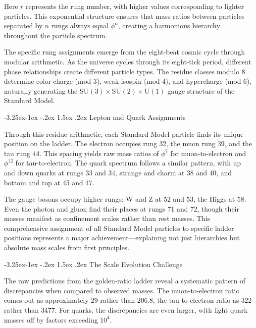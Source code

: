 \documentclass[11pt,a4paper]{article}
\makeatletter
\renewcommand\subsection{\@startsection{subsection}{2}{\z@}%
  {-3.25ex\@plus -1ex \@minus -.2ex}%
  {1.5ex \@plus .2ex}%
  {\normalfont\large\bfseries\color{darkblue}}}
\theoremstyle{definition}
\makeatother
\begin{document}
Here $r$ represents the rung number, with higher values corresponding to lighter particles. This exponential structure ensures that mass ratios between particles separated by $n$ rungs always equal $\phi^n$, creating a harmonious hierarchy throughout the particle spectrum.

The specific rung assignments emerge from the eight-beat cosmic cycle through modular arithmetic. As the universe cycles through its eight-tick period, different phase relationships create different particle types. The residue classes modulo 8 determine color charge (mod 3), weak isospin (mod 4), and hypercharge (mod 6), naturally generating the $\text{SU}(3) \times \text{SU}(2) \times \text{U}(1)$ gauge structure of the Standard Model.

\subsection{Lepton and Quark Assignments}

Through this residue arithmetic, each Standard Model particle finds its unique position on the ladder. The electron occupies rung 32, the muon rung 39, and the tau rung 44. This spacing yields raw mass ratios of $\phi^7$ for muon-to-electron and $\phi^{12}$ for tau-to-electron. The quark spectrum follows a similar pattern, with up and down quarks at rungs 33 and 34, strange and charm at 38 and 40, and bottom and top at 45 and 47.

The gauge bosons occupy higher rungs: W and Z at 52 and 53, the Higgs at 58. Even the photon and gluon find their places at rungs 71 and 72, though their masses manifest as confinement scales rather than rest masses. This comprehensive assignment of all Standard Model particles to specific ladder positions represents a major achievement—explaining not just hierarchies but absolute mass scales from first principles.

\subsection{The Scale Evolution Challenge}

The raw predictions from the golden-ratio ladder reveal a systematic pattern of discrepancies when compared to observed masses. The muon-to-electron ratio comes out as approximately 29 rather than 206.8, the tau-to-electron ratio as 322 rather than 3477. For quarks, the discrepancies are even larger, with light quark masses off by factors exceeding $10^4$.
\end{document}
